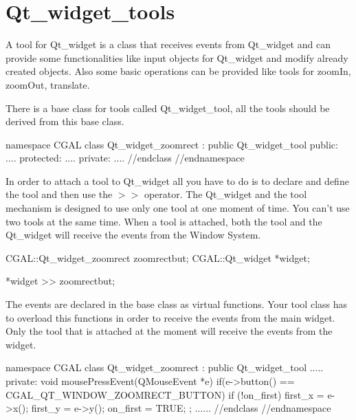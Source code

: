 
\section{Qt\_widget\_tools}
\label{Qt_widget_tools}


\ccDefinition

A tool for Qt\_widget is a class that receives events from Qt\_widget and can 
provide some functionalities like input objects for Qt\_widget and modify 
already created objects. Also some basic operations can be provided like tools
for zoomIn, zoomOut, translate.

There is a base class for tools called Qt\_widget\_tool, all the tools should 
be derived from this base class.
\begin{ccExampleCode}
namespace CGAL {
class Qt_widget_zoomrect : public Qt_widget_tool
{
public:
	....
protected:
	....
private:
	....
}//endclass
}//endnamespace
\end{ccExampleCode}
In order to attach a tool to Qt\_widget all you have to do is to declare and 
define the tool and then use the \(>>\) operator. The Qt\_widget and the tool
mechanism is designed to use only one tool at one moment of time. You can't
use two tools at the same time. When a tool is attached, both the tool and the
Qt\_widget will receive the events from the Window System.
\begin{ccExampleCode}
CGAL::Qt_widget_zoomrect	zoomrectbut;
CGAL::Qt_widget			*widget;

*widget >> zoomrectbut;
\end{ccExampleCode}
The events are declared in the base class as virtual functions. Your tool class
has to overload this functions in order to receive the events from the main 
widget. Only the tool that is attached at the moment will receive the events
from the widget.
\begin{ccExampleCode}
namespace CGAL {
class Qt_widget_zoomrect : public Qt_widget_tool
{
.....
private:
  void mousePressEvent(QMouseEvent *e)
  {
    if(e->button() == CGAL_QT_WINDOW_ZOOMRECT_BUTTON)
    {
      if (!on_first)
      {
        first_x = e->x();
        first_y = e->y();
        on_first = TRUE;
      }
    }
  };
......
}//endclass
}//endnamespace
\end{ccExampleCode}

